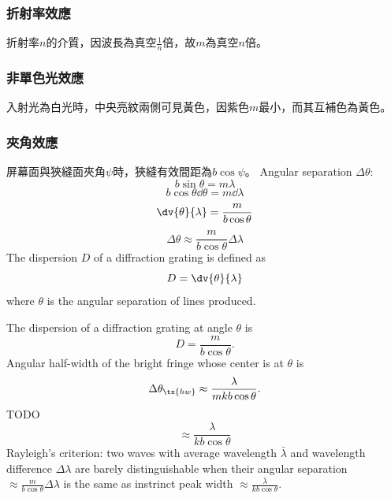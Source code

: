 \documentclass[a4paper,12pt]{report}
\begin{document}
\subsubsection{折射率效應}
折射率$n$的介質，因波長為真空$\frac{1}{n}$倍，故$m$為真空$n$倍。
\subsubsection{非單色光效應}
入射光為白光時，中央亮紋兩側可見黃色，因紫色$m$最小，而其互補色為黃色。
\subsubsection{夾角效應}
屏幕面與狹縫面夾角$\psi$時，狹縫有效間距為$b\cos\psi$。
Angular separation $\Delta\theta$:
\[b\sin\theta=m\lambda\]
\[b\cos\theta\dd{\theta}=m\dd{\lambda}\]
\[\dv{\theta}{\lambda}=\frac{m}{b\cos\theta}\]
\[\Delta\theta\approx\frac{m}{b\cos\theta}\Delta\lambda\]
The dispersion $D$ of a diffraction grating is defined as
\[D=\dv{\theta}{\lambda}\]
where $\theta$ is the angular separation of lines produced.

The dispersion of a diffraction grating at angle $\theta$ is
\[D=\frac{m}{b\cos\theta}.\]
Angular half-width of the bright fringe whose center is at $\theta$ is
\[\Delta\theta_{\tx{hw}}\approx\frac{\lambda}{mkb\cos\theta}.\]
\bpr
TODO 
\epr
{}
\[\approx \frac{\lambda}{kb\cos\theta}\]
Rayleigh's criterion: two waves with average wavelength $\bar{\lambda}$ and wavelength difference $\Delta\lambda$ are barely distinguishable when their angular separation $\approx\frac{m}{b\cos\theta}\Delta\lambda$ is the same as instrinct peak width $\approx \frac{\bar{\lambda}}{kb\cos\theta}$.
\end{document}
